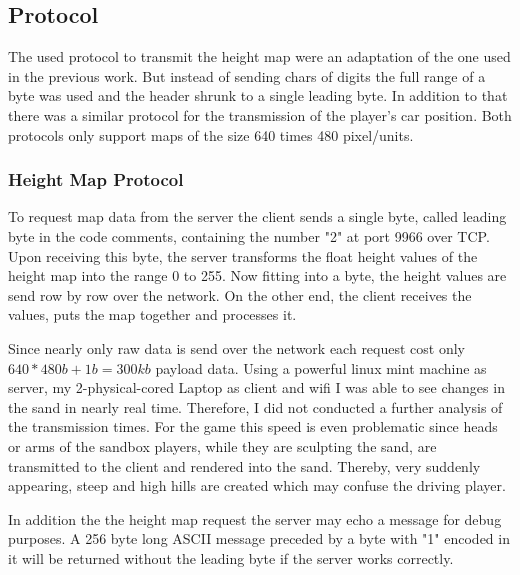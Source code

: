 \documentclass[12pt,a4paper,twoside,titlepage,headsepline,numbers=noenddot,listof=totoc,index=totoc,bibliography=totoc]{scrartcl}
\theoremstyle{break}
\begin{document}
\subsection{Protocol}
\label{ch:protocol}
The used protocol to transmit the height map were an adaptation of the one used in the previous work. But instead of sending chars of digits the full range of a byte was used and the header shrunk to a single leading byte. In addition to that there was a similar protocol for the transmission of the player's car position.  
Both protocols only support maps of the size 640 times 480 pixel/units.

\subsubsection{Height Map Protocol}
To request map data from the server the client sends a single byte, called leading byte in the code comments, containing the number "2" at port 9966 over TCP. Upon receiving this byte, the server transforms the float height values of the height map into the range 0 to 255. Now fitting into a byte, the height values are send row by row over the network. On the other end, the client receives the values, puts the map together and processes it. 

Since nearly only raw data is send over the network each request cost only $640*480b+1b=300kb$ payload data. Using a powerful linux mint machine as server, my 2-physical-cored Laptop as client and wifi I was able to see changes in the sand in nearly real time. Therefore, I did not conducted a further analysis of the transmission times. For the game this speed is even problematic since heads or arms of the sandbox players, while they are sculpting the sand, are transmitted to the client and rendered into the sand. Thereby, very suddenly appearing, steep and high hills are created which may confuse the driving player.

In addition the the height map request the server may echo a message for debug purposes. A 256 byte long ASCII message preceded by a byte with "1" encoded in it will be returned without the leading byte if the server works correctly.
\end{document}
